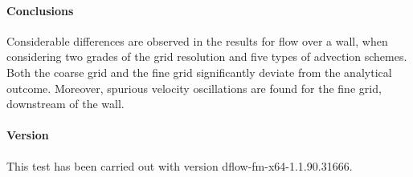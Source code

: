 \paragraph*{Conclusions}
Considerable differences are observed in the results for flow over a wall, when considering two grades of the grid resolution and five types of advection schemes. Both the coarse grid and the fine grid significantly deviate from the analytical outcome. Moreover, spurious velocity oscillations are found for the fine grid, downstream of the wall. 


\paragraph*{Version}
This test has been carried out with version dflow-fm-x64-1.1.90.31666.